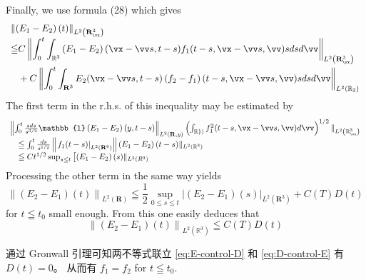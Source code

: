 Finally, we use formula (28) which gives
\[
\begin{array}{l}
\left\|\left(E_{1}-E_{2}\right)(t)\right\|_{L^{2}\left(\mathbf{R}_{\vx}^{3}\right)} \\
\begin{aligned}
\leqq & C\left\|\int_{0}^{t} \int_{\mathbb{R}^{3}}\left(E_{1}-E_{2}\right)(\vx-\vv s, t-s) f_{1}(t-s, \vx-\vv s, \vv) s d s d \vv\right\|_{L^{2}\left(\mathbf{R}_{\vx}^{3}\right)} \\
&+C\left\|\int_{0}^{t} \int_{\mathbf{R}^{3}} E_{2}(\vx-\vv s, t-s)\left(f_{2}-f_{1}\right)(t-s, \vx-\vv s, \vv) s d s d \vv\right\|_{L^{2}\left(\mathbb{R}_{2}\right)}
\end{aligned}
\end{array}
\]
The first term in the r.h.s. of this inequality may be estimated by
\[
\begin{array}{l}
\left\|\int_{0}^{t} \frac{s d s}{s^{3 / 2}} \mathbb{l}\left(E_{1}-E_{2}\right)(y, t-s)\right\|_{L^{2}(\mathbf{R}, y)}\left(\int_{\mathbb{R}\})} f_{1}^{2}(t-s, \vx-\vv s, \vv) d \vv\right)^{1 / 2} \|_{L^{2}\left(\mathbb{R}_{\vx}^{3}\right)} \\
\quad \leqq \int_{0}^{t} \frac{d s}{s^{1 / 2}}\left\|\left.f_{1}(t-s)\right|_{L^{2}\left(\mathbf{R}^{6}\right)}\right\|\left(E_{1}-E_{2}\right)(t-s) \|_{L^{2}\left(\mathbb{R}^{3}\right)} \\
\quad \leqq C t^{1 / 2} \sup _{s \leq t}\left[\left(E_{1}-E_{2}\right)(s) \|_{L^{2}\left(R^{3}\right)}\right.
\end{array}
\]
Processing the other term in the same way yields
\[
\left\|\left(E_{2}-E_{1}\right)(t)\right\|_{L^{2}(\mathbf{R})} \leqq \frac{1}{2} \sup _{0 \leq s \leq t}\left|\left(E_{2}-E_{1}\right)(s)\right|_{L^{2}\left(\mathbf{R}^{3}\right)}+C(T) D(t)
\]
for $t \leqq t_{0}$ small enough. From this one easily deduces that
\begin{equation}
\label{eq:D-control-E}
\left\|\left(E_{2}-E_{1}\right)(t)\right\|_{L^{2}\left(\mathbb{R}^{3}\right)} \leqq C(T) D(t)
\end{equation}

通过 Gronwall 引理可知两不等式联立 \ref{eq:E-control-D} 和 \ref{eq:D-control-E} 有 $D(t)=0$。 从而有 $f_{1}=f_{2}$ for $t \leqq t_{0}$.